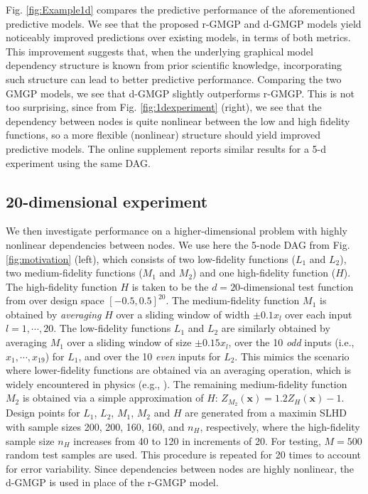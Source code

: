 \documentclass[12pt]{article}
\newcommand{\bs}[1]{\boldsymbol{#1}}
\begin{document}
Fig. \ref{fig:Example1d} compares the predictive performance of the aforementioned predictive models. We see that the proposed r-GMGP and d-GMGP models yield noticeably improved predictions over existing models, in terms of both metrics. This improvement suggests that, when the underlying graphical model dependency structure is known from prior scientific knowledge, incorporating such structure can lead to better predictive performance. Comparing the two GMGP models, we see that d-GMGP slightly outperforms r-GMGP. This is not too surprising, since from Fig. \ref{fig:1dexperiment} (right), we see that the dependency between nodes is quite nonlinear between the low and high fidelity functions, so a more flexible (nonlinear) structure should yield improved predictive models. The online supplement reports similar results for a 5-d experiment using the same DAG.


\subsection{20-dimensional experiment}
\label{subsec:20dexp}


We then investigate performance on a higher-dimensional problem with highly nonlinear dependencies between nodes. We use here the 5-node DAG from Fig. \ref{fig:motivation} (left), which consists of two low-fidelity functions ($L_1$ and $L_2$), two medium-fidelity functions ($M_1$ and $M_2$) and one high-fidelity function ($H$). The high-fidelity function $H$ is taken to be the $d=20$-dimensional test function from \cite{WELCH1992} over design space $[-0.5,0.5]^{20}$. The medium-fidelity function $M_1$ is obtained by \textit{averaging} $H$ over a sliding window of width $\pm 0.1x_l$ over each input $l=1, \cdots, 20$. The low-fidelity functions $L_1$ and $L_2$ are similarly obtained by averaging $M_1$ over a sliding window of size $\pm 0.15x_l$, over the 10 \textit{odd} inputs (i.e., $x_1, \cdots, x_{19}$) for $L_1$, and over the 10 \textit{even} inputs for $L_2$. This mimics the scenario where lower-fidelity functions are obtained via an averaging operation, which is widely encountered in physics (e.g., \citealp{pope2000turbulent}). The remaining medium-fidelity function $M_2$ is obtained via a simple approximation of $H$: $Z_{M_2}(\bs{x}) = 1.2 Z_H(\bs{x})-1$. Design points for $L_1$, $L_2$, $M_1$, $M_2$ and $H$ are generated from a maximin SLHD with sample sizes 200, 200, 160, 160, and $n_H$, respectively, where the high-fidelity sample size $n_H$ increases from 40 to 120 in increments of 20. For testing, $M=500$ random test samples are used. This procedure is repeated for 20 times to account for error variability. Since dependencies between nodes are highly nonlinear, the d-GMGP is used in place of the r-GMGP model.
\end{document}
